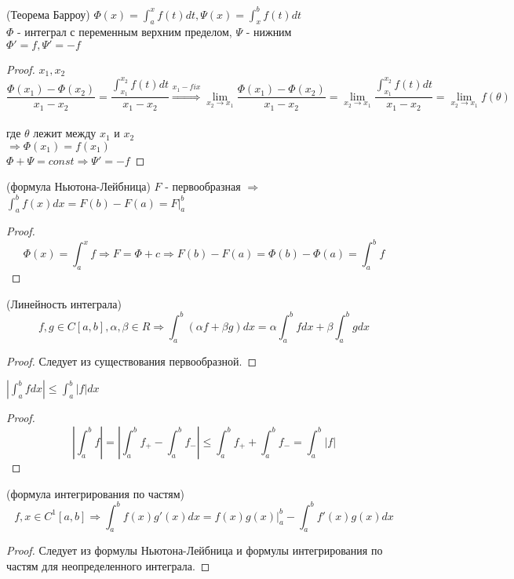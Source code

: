 \begin{properties}
    \item(Теорема Барроу) $\Phi(x) = \int_a^x f(t) dt, \Psi(x) = \int_x^b f(t) dt$ \\
    $\Phi$ - интеграл с переменным верхним пределом, $\Psi$ - нижним \\
    $\Phi' = f, \Psi' = -f$
    \begin{proof}
        $x_1, x_2$ 
        \[\frac {\Phi(x_1) - \Phi(x_2)} {x_1 - x_2}
        = \frac {\int_{x_1}^{x_2} f(t) dt} {x_1 - x_2}  
        \stackrel{x_1- fix}{\Rightarrow} \lim_{x_2 \to x_1} \frac {\Phi(x_1) - \Phi(x_2)} {x_1 - x_2}
        = \lim_{x_2 \to x_1} \frac {\int_{x_1}^{x_2} f(t) dt} {x_1 - x_2}
        = \lim_{x_2 \to x_1} f(\theta)\] \\
        где $\theta$ лежит между $x_1$ и $x_2$ \\
        $\Rightarrow \Phi(x_1) = f(x_1)$ \\
        $\Phi + \Psi = const \Rightarrow \Psi' = -f$
    \end{proof}

    \item(формула Ньютона-Лейбница) $F$ - первообразная $\Rightarrow$ \\
    $\int_a^b f(x) dx = F(b) - F(a) = F|_a^b$
    \begin{proof}
        \[ \Phi(x) = \int_a^x f \Rightarrow F = \Phi + c \Rightarrow F(b) - F(a)
        = \Phi(b) - \Phi(a) = \int_a^b f \]
    \end{proof}

    \item(Линейность интеграла) \[f, g \in C[a, b], \alpha, \beta \in R \Rightarrow
    \int_a^b (\alpha f + \beta g) dx = \alpha \int_a^b f dx + \beta \int_a^b g dx \] 
    \begin{proof}
        Следует из существования первообразной.
    \end{proof}
    \item $|\int_a^b f dx| \leq \int_a^b |f| dx$
    \begin{proof}
        \[ \left|\int_a^b f\right| = \left|\int_a^b f_+ - \int_a^b f_-\right| \leq
            \int_a^b f_+ + \int_a^b f_- = \int_a^b |f| \]
    \end{proof}
    
    \item(формула интегрирования по частям)
    \[f, x \in C^1[a, b] \Rightarrow
    \int_a^b f(x) g'(x) dx = f(x)g(x)\bigg|_a^b - \int_a^b f'(x)g(x) dx \]

    \begin{proof}
        Следует из формулы Ньютона-Лейбница и формулы интегрирования по частям для неопределенного интеграла.
    \end{proof}


\end{properties}

